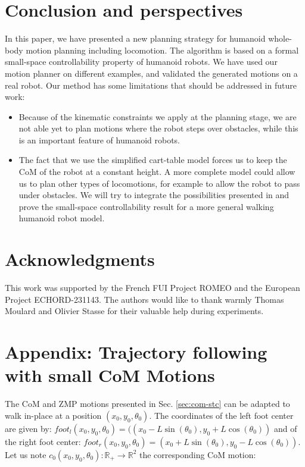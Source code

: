 \documentclass{article}
\begin{document}
\section{Conclusion and perspectives}

In this paper, we have presented a new planning strategy for humanoid whole-body
motion planning including locomotion. The algorithm is based on a formal
small-space controllability property of humanoid robots. 
We have used our motion planner on different examples, and validated the
generated motions on a real robot.
Our method has some limitations that should be addressed in future work:
\begin{itemize}
\item Because of the kinematic constraints we apply at the planning stage, we are not
	able yet to plan motions where the robot steps over obstacles, while this is an 
	important feature of humanoid robots.
\item The fact that we use the simplified cart-table model forces us to keep the CoM
	of the robot at a constant height. A more complete model could allow us to plan
	other types of locomotions, for example to allow the robot to pass under 
	obstacles. We will try to integrate the possibilities 
        presented in \cite{kanehiro2004locomotion} and prove the small-space controllability
        result for a more general walking humanoid robot model.
\end{itemize}

\section{Acknowledgments}

This work was supported by the French FUI Project ROMEO and the European Project ECHORD-231143. 
The authors would like to thank warmly Thomas Moulard and Olivier Stasse for their valuable help during experiments.

\section*{Appendix: Trajectory following with small CoM Motions}


The  CoM  and ZMP  motions  presented in Sec. \ref{sec:com-stc} 
 can  be  adapted to  walk
in-place  at  a position  $(x_0,y_0,\theta_0)$. The coordinates  of the
left foot center are given by: 
$foot_l(x_0,y_0,\theta_0) = (\left( x_0 - L  \sin (\theta_0), y_0 + L \cos
(\theta_0)\right)$
and of the right foot center: 
$foot_r(x_0,y_0,\theta_0) = \left( x_0 + L  \sin (\theta_0), y_0 - L \cos
(\theta_0)\right)$. Let us  note $c_0(x_0,y_0,\theta_0) : \mathbb{R}_+
\rightarrow \mathbb{R}^2$ the corresponding CoM motion:
\end{document}
